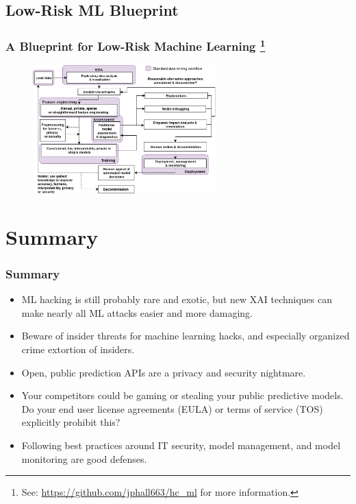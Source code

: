 \documentclass[11pt,
               aspectratio=169,
               hyperref={colorlinks}
               ]{beamer}
\begin{document}
		\subsection{Low-Risk ML Blueprint}

		\begin{frame}
		
			\frametitle{A Blueprint for Low-Risk Machine Learning \footnote{See: \url{ https://github.com/jphall663/hc_ml} for more information.} }		
			
			\begin{figure}[htb]
				\begin{center}
					\includegraphics[height=140pt]{img/blueprint.png}
				\end{center}
			\end{figure}	

		\end{frame}

	\section{Summary}

		\begin{frame}
		
			\frametitle{Summary}		
			
			\begin{itemize}
				\item ML hacking is still probably rare and exotic, but new XAI techniques can make nearly all ML attacks easier and more damaging.
				\item Beware of insider threats for machine learning hacks, and especially organized crime extortion of insiders. 
				\item Open, public prediction APIs are a privacy and security nightmare. 
				\item Your competitors could be gaming or stealing your public predictive models. Do your end user license agreements (EULA) or terms of service (TOS) explicitly prohibit this?
				\item Following best practices around IT security, model management, and model monitoring are good defenses.
			\end{itemize}
		
		\end{frame}
\end{document}
